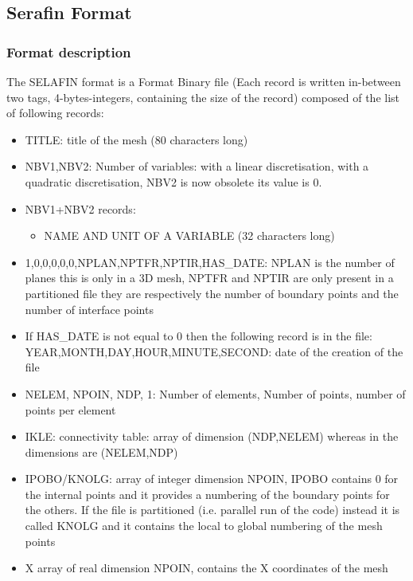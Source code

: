 %
\subsection{Serafin Format}
%

%
\subsubsection{Format description}
%
The SELAFIN format is a Format Binary file (Each record is written in-between
two tags, 4-bytes-integers, containing the size of the record) composed of
the list of following records:
\begin{itemize}
\item TITLE: title of the mesh (80 characters long)
\item NBV1,NBV2: Number of variables: with a linear discretisation, with a
quadratic discretisation, NBV2 is now obsolete its value is 0.
\item NBV1+NBV2 records:
\begin{itemize}
\item NAME AND UNIT OF A VARIABLE (32 characters long)
\end{itemize}
\item 1,0,0,0,0,0,NPLAN,NPTFR,NPTIR,HAS\_DATE: NPLAN is the number of planes
this is only in a 3D mesh, NPTFR and NPTIR are only present in a partitioned
file they are respectively the number of boundary points and the number of
interface points
\item If HAS\_DATE is not equal to 0 then the following record is in the
file:\\ YEAR,MONTH,DAY,HOUR,MINUTE,SECOND: date of the creation of the file
\item NELEM, NPOIN, NDP, 1: Number of elements, Number of points, number of
points per element
\item IKLE: connectivity table: array of dimension (NDP,NELEM) whereas in
\telemacsystem the dimensions are (NELEM,NDP)
\item IPOBO/KNOLG: array of integer dimension NPOIN, IPOBO contains 0 for the
internal points and it provides a numbering of the boundary points for the
others. If the file is partitioned (i.e. parallel run of the code) instead it
is called KNOLG and it contains the local to global numbering of the mesh
points
\item X array of real dimension NPOIN, contains the X coordinates of the mesh

\end{itemize}
